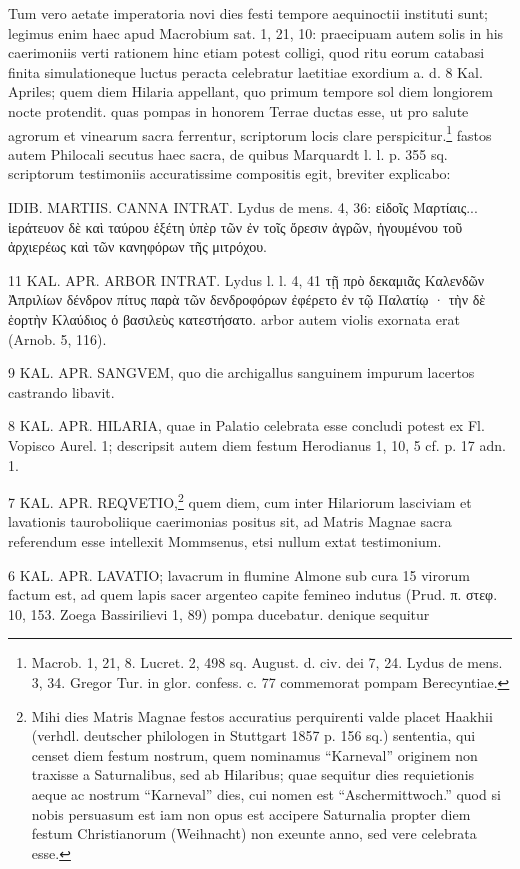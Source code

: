 \documentclass[a4paper, 11pt, oneside, polutonikogreek, german, twocolumn]{article}
\begin{document}
Tum vero aetate imperatoria novi dies festi tempore aequinoctii instituti sunt; legimus enim haec apud Macrobium sat. 1, 21, 10: praecipuam autem solis in his caerimoniis verti rationem hinc etiam potest colligi, quod ritu eorum catabasi finita simulationeque luctus peracta celebratur laetitiae exordium a. d. 8 Kal. Apriles; quem diem Hilaria appellant, quo primum tempore sol diem longiorem nocte protendit. quas pompas in honorem Terrae ductas esse, ut pro salute agrorum et vinearum sacra ferrentur, scriptorum locis clare perspicitur.\footnote{Macrob. 1, 21, 8. Lucret. 2, 498 sq. August. d. civ. dei 7, 24. Lydus de mens. 3, 34. Gregor Tur. in glor. confess. c. 77 commemorat pompam Berecyntiae.} fastos autem Philocali secutus haec sacra, de quibus Marquardt l. l. p. 355 sq. scriptorum testimoniis accuratissime compositis egit, breviter explicabo:

IDIB. MARTIIS. CANNA INTRAT. Lydus de mens. 4, 36: εἰδοῖς Μαρτίαις... ἱεράτευον δὲ καὶ ταύρου ἑξέτη ὑπὲρ τῶν ἐν τοῖς ὄρεσιν ἀγρῶν, ἡγουμένου τοῦ ἀρχιερέως καὶ τῶν κανηφόρων τῆς μιτρόχου.

11 KAL. APR. ARBOR INTRAT. Lydus l. l. 4, 41 τῇ πρὸ δεκαμιᾶς Καλενδῶν Ἀπριλίων δένδρον πίτυς παρὰ τῶν δενδροφόρων ἐφέρετο ἐν τῷ Παλατίῳ · τὴν δὲ ἑορτὴν Κλαύδιος ὁ βασιλεὺς κατεστήσατο. arbor autem violis exornata erat (Arnob. 5, 116).

9 KAL. APR. SANGVEM, quo die archigallus sanguinem impurum lacertos castrando libavit.

8 KAL. APR. HILARIA, quae in Palatio celebrata esse concludi potest ex Fl. Vopisco Aurel. 1; descripsit autem diem festum Herodianus 1, 10, 5 cf. p. 17 adn. 1.

7 KAL. APR. REQVETIO,\footnote{Mihi dies Matris Magnae festos accuratius perquirenti valde placet Haakhii (verhdl. deutscher philologen in Stuttgart 1857 p. 156 sq.) sententia, qui censet diem festum nostrum, quem nominamus "`Karneval"' originem non traxisse a Saturnalibus, sed ab Hilaribus; quae sequitur dies requietionis aeque ac nostrum "`Karneval"' dies, cui nomen est "`Aschermittwoch."' quod si nobis persuasum est iam non opus est accipere Saturnalia propter diem festum Christianorum (Weihnacht) non exeunte anno, sed vere celebrata esse.} quem diem, cum inter Hilariorum lasciviam et lavationis tauroboliique caerimonias positus sit, ad Matris Magnae sacra referendum esse intellexit Mommsenus, etsi nullum extat testimonium.

6 KAL. APR. LAVATIO; lavacrum in flumine Almone sub cura 15 virorum factum est, ad quem lapis sacer argenteo capite femineo indutus (Prud. π. στεφ. 10, 153. Zoega Bassirilievi 1, 89) pompa ducebatur. denique sequitur
\end{document}
